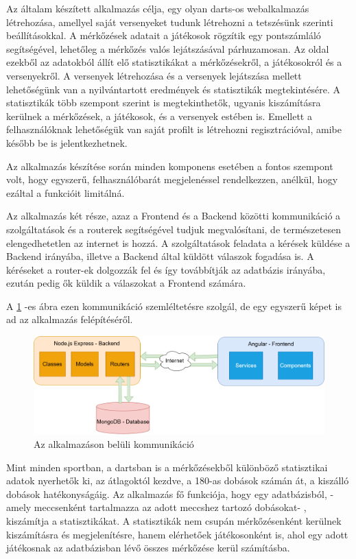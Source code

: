 
Az általam készített alkalmazás célja, egy olyan darts-os webalkalmazás létrehozása, amellyel saját versenyeket tudunk létrehozni a tetszésünk szerinti beállításokkal. A mérkőzések adatait a játékosok rögzítik egy pontszámláló segítségével, lehetőleg a mérkőzés valós lejátszásával párhuzamosan. Az oldal ezekből az adatokból állít elő statisztikákat a mérkőzésekről, a játékosokról és a versenyekről. A versenyek létrehozása és a versenyek lejátszása mellett lehetőségünk van a nyilvántartott eredmények és statisztikák megtekintésére. A statisztikák több szempont szerint is megtekinthetők, ugyanis kiszámításra kerülnek a mérkőzések, a játékosok, és a versenyek estében is. Emellett a felhasználóknak lehetőségük van saját profilt is létrehozni regisztrációval, amibe később be is jelentkezhetnek.

Az alkalmazás készítése során minden komponens esetében a fontos szempont volt, hogy egyszerű, felhasználóbarát megjelenéssel rendelkezzen, anélkül, hogy ezáltal a funkcióit limitálná.

Az alkalmazás két része, azaz a Frontend és a Backend közötti kommunikáció a szolgáltatások és a routerek segítségével tudjuk megvalósítani, de természetesen elengedhetetlen az internet is hozzá. A szolgáltatások feladata a kérések küldése a Backend irányába, illetve a Backend által küldött válaszok fogadása is. A kéréseket a router-ek dolgozzák fel és így továbbítják az adatbázis irányába, ezután pedig ők küldik a válaszokat a Frontend számára.

A \ref{fig:network} -es ábra ezen kommunikáció szemléltetésre szolgál, de egy egyszerű képet is ad az alkalmazás felépítéséről.

\begin{figure}[h]
\centering
\includegraphics[scale=0.45]{images/DoubleOut_Network.drawio.png}
\caption{Az alkalmazáson belüli kommunikáció}
\label{fig:network}
\end{figure}

Mint minden sportban, a dartsban is a mérkőzésekből különböző statisztikai adatok nyerhetők ki, az átlagoktól kezdve, a 180-as dobások számán át, a kiszálló dobások hatékonyságáig. Az alkalmazás fő funkciója, hogy egy adatbázisból, - amely meccsenként tartalmazza az adott meccshez tartozó dobásokat- , kiszámítja a statisztikákat. A statisztikák nem csupán mérkőzésenként kerülnek kiszámításra és megjelenítésre, hanem elérhetőek játékosonként is, ahol egy adott játékosnak az adatbázisban lévő összes mérkőzése kerül számításba.

